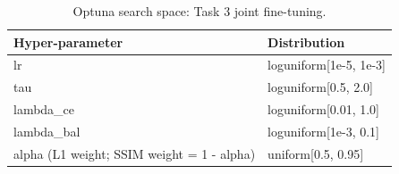 \begin{table}[t]
\centering
\caption{Optuna search space: Task 3 joint fine-tuning.}
\label{tab:optuna_moe_space}
\footnotesize
\begin{tabular}{ll}
\toprule
Hyper-parameter & Distribution \\
\midrule
lr & loguniform[1e-5, 1e-3] \\
tau & loguniform[0.5, 2.0] \\
lambda\_ce & loguniform[0.01, 1.0] \\
lambda\_bal & loguniform[1e-3, 0.1] \\
alpha (L1 weight; SSIM weight = 1 - alpha) & uniform[0.5, 0.95] \\
\bottomrule
\end{tabular}
\end{table}
